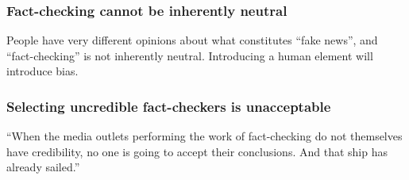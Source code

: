 \subsubsection{Fact-checking cannot be inherently neutral}

People have very different opinions about what constitutes ``fake news'', and ``fact-checking'' is not inherently neutral. Introducing a human element will introduce bias. \cite{vox_sentences_fn} \cite{inc_fb_transparency}

\subsubsection{Selecting uncredible fact-checkers is unacceptable}

``When the media outlets performing the work of fact-checking do not themselves have credibility, no one is going to accept their conclusions. And that ship has already sailed.'' \cite{vox_sentences_fn}

